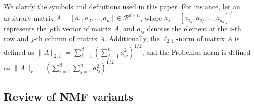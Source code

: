 \documentclass[a4paper,fleqn]{cas-sc}
\begin{document}
We clarify the symbols and definitions used in this paper. For instance, let an arbitrary matrix $A=\left[a_1, a_2, \ldots, a_n\right] \in \mathcal{R}^{d \times n}$, where $a_j=\left[a_{1j}, a_{2j}, \ldots, a_{dj}\right]^T$ represents the $j$-th vector of matrix $A$, and $a_{i j}$ denotes the element at the $i$-th row and $j$-th column of matrix $A$. Additionally, the $\ell_{2,1}$-norm of matrix $A$ is defined as $\|A\|_{2,1} = \sum_{i=1}^d \left( \sum_{j=1}^n a_{i j}^2 \right)^{1 / 2}$, and the Frobenius norm is defined as $\|A\|_F = \left( \sum_{i=1}^d \sum_{j=1}^n a_{ij}^2 \right)^{1/2}$.

\subsection{Review of NMF variants}
\end{document}
